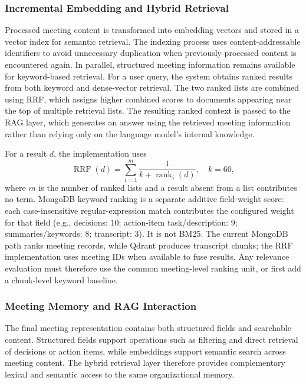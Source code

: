 \documentclass[conference]{IEEEtran}
\begin{document}
\subsubsection{Incremental Embedding and Hybrid Retrieval}
Processed meeting content is transformed into embedding vectors and stored in a vector index for semantic retrieval. The indexing process uses content-addressable identifiers to avoid unnecessary duplication when previously processed content is encountered again. In parallel, structured meeting information remains available for keyword-based retrieval.
For a user query, the system obtains ranked results from both keyword and dense-vector retrieval. The two ranked lists are combined using RRF, which assigns higher combined scores to documents appearing near the top of multiple retrieval lists. The resulting ranked context is passed to the RAG layer, which generates an answer using the retrieved meeting information rather than relying only on the language model's internal knowledge.

For a result $d$, the implementation uses
\begin{equation}
\operatorname{RRF}(d)=\sum_{i=1}^{m}\frac{1}{k+\operatorname{rank}_{i}(d)},\quad k=60,
\end{equation}
where $m$ is the number of ranked lists and a result absent from a list contributes no term. MongoDB keyword ranking is a separate additive field-weight score: each case-insensitive regular-expression match contributes the configured weight for that field (e.g., decisions: 10; action-item task/description: 9; summaries/keywords: 8; transcript: 3). It is not BM25. The current MongoDB path ranks meeting records, while Qdrant produces transcript chunks; the RRF implementation uses meeting IDs when available to fuse results. Any relevance evaluation must therefore use the common meeting-level ranking unit, or first add a chunk-level keyword baseline.

\subsubsection{Meeting Memory and RAG Interaction}
The final meeting representation contains both structured fields and searchable content. Structured fields support operations such as filtering and direct retrieval of decisions or action items, while embeddings support semantic search across meeting content. The hybrid retrieval layer therefore provides complementary lexical and semantic access to the same organizational memory.
\end{document}
